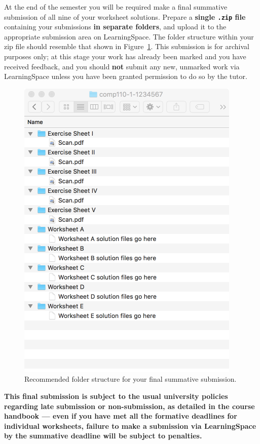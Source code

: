 \documentclass{../../fal_assignment}
\begin{document}
At the end of the semester you will be required make a final summative submission of all nine of your worksheet solutions.
Prepare a \textbf{single \texttt{.zip} file} containing your submissions \textbf{in separate folders}, and upload it to the appropriate submission area on LearningSpace. The folder structure within your zip file should resemble that shown in Figure~\ref{fig:folder_structure}.
This submission is for archival purposes only; at this stage your work has already been marked and you have received feedback, and you should \textbf{not} submit any new, unmarked work via LearningSpace unless you have been granted permission to do so by the tutor.
\begin{figure}
    \begin{center}
        \includegraphics[height=0.4\textheight]{folder_structure}
    \end{center}
    \caption{Recommended folder structure for your final summative submission.}
    \label{fig:folder_structure}
\end{figure}

\textbf{This final submission is subject to the usual university policies regarding late submission or non-submission,
as detailed in the course handbook ---
even if you have met all the formative deadlines for individual worksheets,
failure to make a submission via LearningSpace by the summative deadline will be subject to penalties.}
\end{document}
